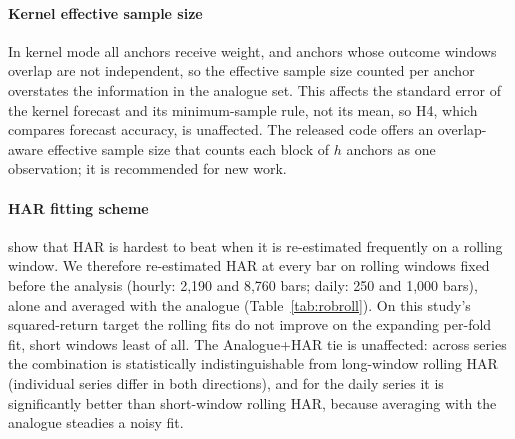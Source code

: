 \begin{table}[h]
\centering\scriptsize
\caption{Fixed versus Politis--White bootstrap block lengths.}
\label{tab:robblk}
\resizebox{\linewidth}{!}{}
\end{table}

\paragraph{Kernel effective sample size} In kernel mode all anchors receive weight, and anchors
whose outcome windows overlap are not independent, so the \citet{kish1965} effective sample size
counted per anchor overstates the information in the analogue set. This affects the standard
error of the kernel forecast and its minimum-sample rule, not its mean, so H4, which compares
forecast accuracy, is unaffected. The released code offers an overlap-aware effective sample size
that counts each block of $h$ anchors as one observation; it is recommended for new work.

\paragraph{HAR fitting scheme} \citet{chassot2026} show that HAR is hardest to beat when it is
re-estimated frequently on a rolling window. We therefore re-estimated HAR at every bar on rolling
windows fixed before the analysis (hourly: 2,190 and 8,760 bars; daily: 250 and 1,000 bars), alone
and averaged with the analogue (Table~\ref{tab:robroll}). On this study's squared-return target the
rolling fits do not improve on the expanding per-fold fit, short windows least of all. The
Analogue+HAR tie is unaffected: across series the combination is statistically indistinguishable
from long-window rolling HAR (individual series differ in both directions), and for the daily series
it is significantly better than short-window rolling HAR, because averaging with the analogue
steadies a noisy fit.

\begin{table}[h]
\centering\scriptsize
\caption{Rolling-window HAR. QLIKE ratios are medians across series; ``DM sig.'' counts series with
a significant Diebold--Mariano test in favour of Analogue+HAR / of HAR at 5\%; Wilcoxon tests the
log QLIKE ratios across series (not computed for fewer than five series).}
\label{tab:robroll}
\resizebox{\linewidth}{!}{}
\end{table}

